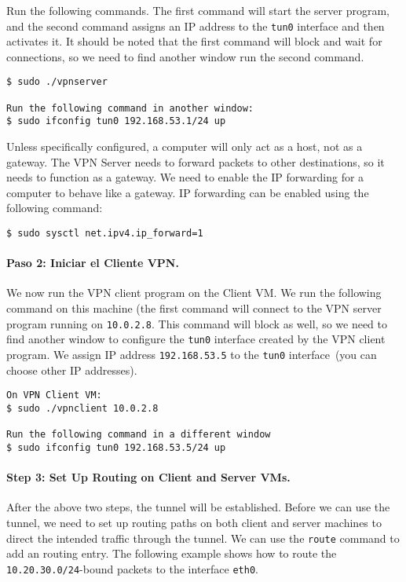 Run the following commands. The first command will start the server
program, and the second command assigns an IP address to the \texttt{tun0}
interface and then activates it. It should be noted that the first
command will block and wait for connections,
so we need to find another window run the second command.


\begin{lstlisting}
$ sudo ./vpnserver

Run the following command in another window:
$ sudo ifconfig tun0 192.168.53.1/24 up
\end{lstlisting}

Unless specifically configured, a computer will only act as a host,
not as a gateway. The VPN Server needs to forward packets to other destinations,
so it needs to function as a gateway. We need to
enable the IP forwarding for a computer to behave like a gateway.
IP forwarding can be enabled
using the following command:

\begin{lstlisting}
$ sudo sysctl net.ipv4.ip_forward=1
\end{lstlisting}



\paragraph{Paso 2: Iniciar el Cliente VPN.} 
We now run the VPN client program on the Client
VM.  We run the following command on this machine (the first command
will connect to the VPN server program running on {\tt 10.0.2.8}.
This command will block as well, so we need to find another window to
configure the \texttt{tun0} interface created by the VPN client program.
We assign IP address \texttt{192.168.53.5} to the \texttt{tun0} interface~(you
can choose other IP addresses).


\begin{lstlisting}
On VPN Client VM:
$ sudo ./vpnclient 10.0.2.8

Run the following command in a different window
$ sudo ifconfig tun0 192.168.53.5/24 up
\end{lstlisting}



\paragraph{Step 3: Set Up Routing on Client and Server VMs.}
After the above two steps, the tunnel will be established.
Before we can use the tunnel, we need to set up routing
paths on both client and server machines to direct the intended traffic through
the tunnel. 
We can use the \texttt{route} command to add an routing entry. The
following example shows how to route the \texttt{10.20.30.0/24}-bound
packets to the interface \texttt{eth0}.

